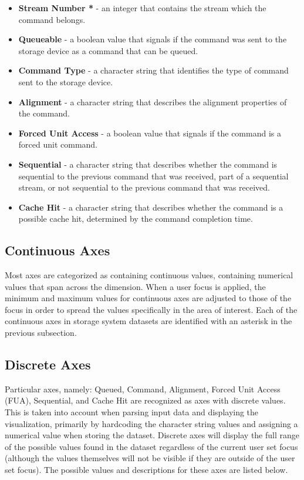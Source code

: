 \documentclass[journal]{vgtc}                %
\begin{document}
\begin{itemize}
\item \textbf{Stream Number *} - an integer that contains the stream which the command belongs.

\item \textbf{Queueable} - a boolean value that signals if the command was sent to the storage device as a command that can be queued. 

\item \textbf{Command Type} - a character string that identifies the type of command sent to the storage device.

\item \textbf{Alignment} - a character string that describes the alignment properties of the command.

\item \textbf{Forced Unit Access} - a boolean value that signals if the command is a forced unit command.

\item \textbf{Sequential} - a character string that describes whether the command is sequential to the previous command that was received, part of a sequential stream, or not sequential to the previous command that was received.

\item \textbf{Cache Hit} - a character string that describes whether the command is a possible cache hit, determined by the command completion time.
\end{itemize}

\subsection{Continuous Axes}
Most axes are categorized as containing continuous values, containing numerical values that span across the dimension. When a user focus is applied, the minimum and maximum values for continuous axes are adjusted to those of the focus in order to spread the values specifically in the area of interest. Each of the continuous axes in storage system datasets are identified with an asterisk in the previous subsection.

\subsection{Discrete Axes}
Particular axes, namely: Queued, Command, Alignment, Forced Unit Access (FUA), Sequential, and Cache Hit are recognized as axes with discrete values. This is taken into account when parsing input data and displaying the visualization, primarily by hardcoding the character string values and assigning a numerical value when storing the dataset. Discrete axes will display the full range of the possible values found in the dataset regardless of the current user set focus (although the values themselves will not be visible if they are outside of the user set focus). The possible values and descriptions for these axes are listed below.
\end{document}
